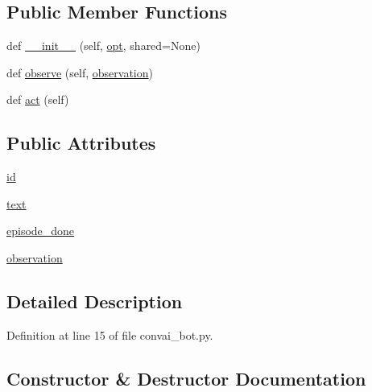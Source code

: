 \subsection*{Public Member Functions}
\begin{DoxyCompactItemize}
\item 
def \hyperlink{classconvai_1_1convai__bot_1_1ConvAISampleAgent_ae487cdd57cfa790248486d88ba938101}{\+\_\+\+\_\+init\+\_\+\+\_\+} (self, \hyperlink{classparlai_1_1core_1_1agents_1_1Agent_ab3b45d2754244608c75d4068b90cd051}{opt}, shared=None)
\item 
def \hyperlink{classconvai_1_1convai__bot_1_1ConvAISampleAgent_a03ce86e26b72bb7d39ff9cdb86fa19e7}{observe} (self, \hyperlink{classconvai_1_1convai__bot_1_1ConvAISampleAgent_a5d7a1d0aacceaa1044d5498c960e9a3a}{observation})
\item 
def \hyperlink{classconvai_1_1convai__bot_1_1ConvAISampleAgent_ad8645a69c3fcbefb4863bf9ebbff3d0c}{act} (self)
\end{DoxyCompactItemize}
\subsection*{Public Attributes}
\begin{DoxyCompactItemize}
\item 
\hyperlink{classconvai_1_1convai__bot_1_1ConvAISampleAgent_ac1ae3f5ce58f6617004ea799999135d7}{id}
\item 
\hyperlink{classconvai_1_1convai__bot_1_1ConvAISampleAgent_afdf656106fff0a322b570c2aca02c2c6}{text}
\item 
\hyperlink{classconvai_1_1convai__bot_1_1ConvAISampleAgent_acffaf8a30b1593391c4b29fadb5b8275}{episode\+\_\+done}
\item 
\hyperlink{classconvai_1_1convai__bot_1_1ConvAISampleAgent_a5d7a1d0aacceaa1044d5498c960e9a3a}{observation}
\end{DoxyCompactItemize}


\subsection{Detailed Description}


Definition at line 15 of file convai\+\_\+bot.\+py.



\subsection{Constructor \& Destructor Documentation}
\mbox{\label{classconvai_1_1convai__bot_1_1ConvAISampleAgent_ae487cdd57cfa790248486d88ba938101}} 
